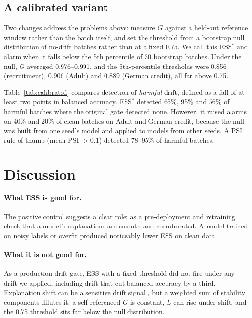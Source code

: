 \documentclass[11pt]{article}
\begin{document}


\subsection{A calibrated variant}
Two changes address the problems above: measure \(G\) against a held-out reference window rather than the batch itself, and set the
threshold from a bootstrap null distribution of no-drift batches rather than at a fixed 0.75. We call this ESS\(^\ast\) and alarm when it
falls below the 5th percentile of 30 bootstrap batches. Under the null, \(G\) averaged 0.976--0.991, and the 5th-percentile thresholds were
0.856 (recruitment), 0.906 (Adult) and 0.889 (German credit), all far above 0.75.

Table~\ref{tab:calibrated} compares detection of \emph{harmful} drift, defined as a fall of at least two points in balanced accuracy.
ESS\(^\ast\) detected 65\%, 95\% and 56\% of harmful batches where the original gate detected none. However, it raised alarms on 40\% and
20\% of clean batches on Adult and German credit, because the null was built from one seed's model and applied to models from other
seeds. A PSI rule of thumb (mean PSI \(>0.1\)) detected 78--95\% of harmful batches.



\section{Discussion}
\paragraph{What ESS is good for.} The positive control suggests a clear role: as a pre-deployment and retraining check that a model's
explanations are smooth and corroborated. A model trained on noisy labels or overfit produced noticeably lower ESS on clean data.

\paragraph{What it is not good for.} As a production drift gate, ESS with a fixed threshold did not fire under any drift we applied,
including drift that cut balanced accuracy by a third. Explanation shift can be a sensitive drift signal \cite{mougan2022explanationshift},
but a weighted sum of stability components dilutes it: a self-referenced \(G\) is constant, \(L\) can rise under shift, and the 0.75
threshold sits far below the null distribution.
\end{document}
